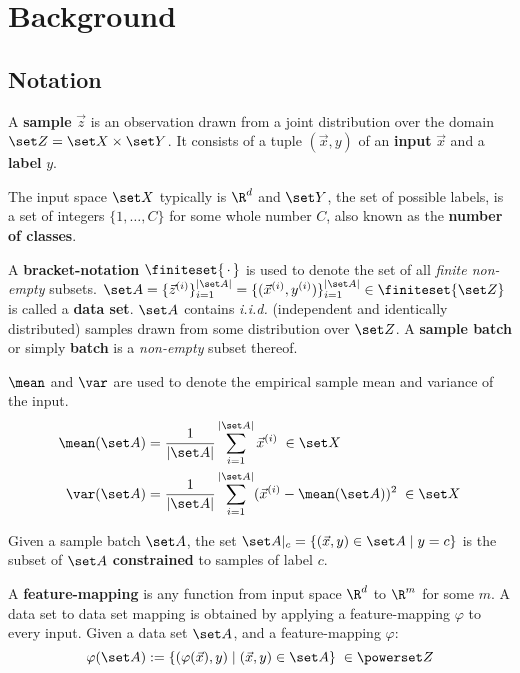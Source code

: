 

\chapter{Background}
\label{chap:Background}

\section{Notation}

A \textbf{sample} $\vec z$ is an observation drawn from a joint distribution over the domain $\set Z = \set X \times \set Y$. 
It consists of a tuple $(\vec x, y)$ of an \textbf{input} $\vec x$ and a \textbf{label} $y$. 

\noindent
The input space $\set X$ typically is $\R^d$ and $\set Y$, the set of possible labels, is a set of integers $\{1, \dots, C\}$ for some whole number $C$, also known as the \textbf{number of classes}.

\noindent
A \textbf{bracket-notation} $\finiteset{\, \cdot \,}$ is used to denote the set of all \textit{finite non-empty} subsets.
$\set A = \{\vec z^{(i)}\}_{i=1}^{| \set A |} = \{(\vec x^{(i)}, y^{(i)})\}_{i=1}^{| \set A |} \in \finiteset{\set Z}$ is called a \textbf{data set}. $\set A $ contains \textit{i.i.d.} (independent and identically distributed) samples drawn from some distribution over $\set Z$.
A \textbf{sample batch} or simply \textbf{batch} is a \textit{non-empty} subset thereof.

\noindent
$\mean$ and $\var$ are used to denote the empirical sample mean and variance of the input.
\begin{align*}
    \mean ({\set A}) &= \frac 1 {\lvert \set A \rvert} \sum _{i=1}^{\lvert \set A \rvert} \vec x^{(i)} \; \in \set X \\
    \var ({\set A}) &= \frac 1 {\lvert \set A \rvert} \sum _{i=1}^{\lvert \set A \rvert} (\vec x^{(i)} - \mean ({\set A}))^2 \; \in \set X
\end{align*}


Given a sample batch $\set A$, the set $\set A|_c = \{(\vec x, y) \in \set A \mid y = c\}$ is the subset of $\set A$ \textbf{constrained} to samples of label $c$.


A \textbf{feature-mapping} is any function from input space $\R^d$ to $\R^m$ for some $m$.
A data set to data set mapping is obtained by applying a feature-mapping $\varphi$ to every input. Given a data set $\set A$, and a feature-mapping $\varphi$:
\[
    \varphi(\set A) := \{(\varphi(\vec x), y) \mid (\vec x, y) \in \set A\} \;
    \in \powerset Z
\]



